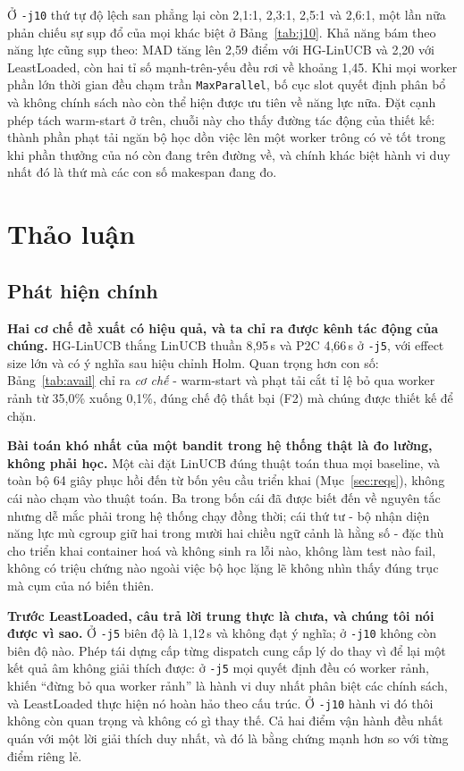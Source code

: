 \documentclass[final,5p,times,twocolumn]{elsarticle}
\begin{document}
Ở \texttt{-j10} thứ tự độ lệch san phẳng lại còn 2,1:1, 2,3:1, 2,5:1 và 2,6:1, một lần nữa phản chiếu sự sụp đổ của mọi khác biệt ở Bảng~\ref{tab:j10}. Khả năng bám theo năng lực cũng sụp theo: MAD tăng lên 2,59 điểm với HG-LinUCB và 2,20 với LeastLoaded, còn hai tỉ số mạnh-trên-yếu đều rơi về khoảng 1,45. Khi mọi worker phần lớn thời gian đều chạm trần \texttt{MaxParallel}, bố cục slot quyết định phân bổ và không chính sách nào còn thể hiện được ưu tiên về năng lực nữa. Đặt cạnh phép tách warm-start ở trên, chuỗi này cho thấy đường tác động của thiết kế: thành phần phạt tải ngăn bộ học dồn việc lên một worker trông có vẻ tốt trong khi phần thưởng của nó còn đang trên đường về, và chính khác biệt hành vi duy nhất đó là thứ mà các con số makespan đang đo.

\section{Thảo luận}
\label{sec:discussion}

\subsection{Phát hiện chính}

\textbf{Hai cơ chế đề xuất có hiệu quả, và ta chỉ ra được kênh tác động của chúng.} HG-LinUCB thắng LinUCB thuần 8,95\,s và P2C 4,66\,s ở \texttt{-j5}, với effect size lớn và có ý nghĩa sau hiệu chỉnh Holm. Quan trọng hơn con số: Bảng~\ref{tab:avail} chỉ ra \emph{cơ chế} - warm-start và phạt tải cắt tỉ lệ bỏ qua worker rảnh từ 35,0\% xuống 0,1\%, đúng chế độ thất bại (F2) mà chúng được thiết kế để chặn.

\textbf{Bài toán khó nhất của một bandit trong hệ thống thật là đo lường, không phải học.} Một cài đặt LinUCB đúng thuật toán thua mọi baseline, và toàn bộ 64 giây phục hồi đến từ bốn yêu cầu triển khai (Mục~\ref{sec:reqs}), không cái nào chạm vào thuật toán. Ba trong bốn cái đã được biết đến về nguyên tắc nhưng dễ mắc phải trong hệ thống chạy đồng thời; cái thứ tư - bộ nhận diện năng lực mù cgroup giữ hai trong mười hai chiều ngữ cảnh là hằng số - đặc thù cho triển khai container hoá và không sinh ra lỗi nào, không làm test nào fail, không có triệu chứng nào ngoài việc bộ học lặng lẽ không nhìn thấy đúng trục mà cụm của nó biến thiên.

\textbf{Trước LeastLoaded, câu trả lời trung thực là chưa, và chúng tôi nói được vì sao.} Ở \texttt{-j5} biên độ là 1,12\,s và không đạt ý nghĩa; ở \texttt{-j10} không còn biên độ nào. Phép tái dựng cấp từng dispatch cung cấp lý do thay vì để lại một kết quả âm không giải thích được: ở \texttt{-j5} mọi quyết định đều có worker rảnh, khiến ``đừng bỏ qua worker rảnh'' là hành vi duy nhất phân biệt các chính sách, và LeastLoaded thực hiện nó hoàn hảo theo cấu trúc. Ở \texttt{-j10} hành vi đó thôi không còn quan trọng và không có gì thay thế. Cả hai điểm vận hành đều nhất quán với một lời giải thích duy nhất, và đó là bằng chứng mạnh hơn so với từng điểm riêng lẻ.
\end{document}
